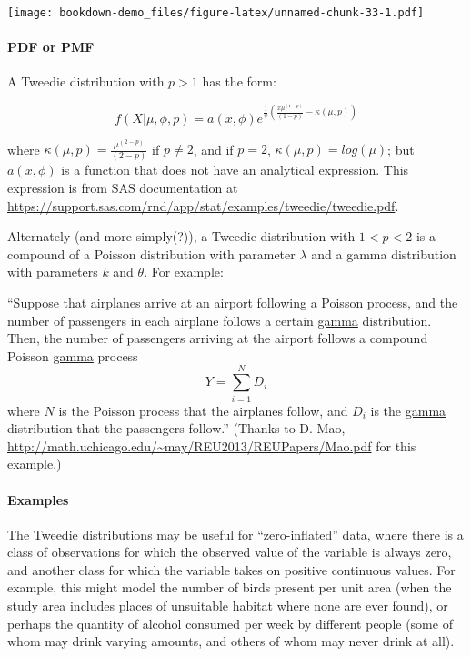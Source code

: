 \documentclass[]{book}
\let\oldparagraph\paragraph
\renewcommand{\paragraph}[1]{\oldparagraph{#1}\mbox{}}
\begin{document}
\texttt{[image: bookdown-demo\_files/figure-latex/unnamed-chunk-33-1.pdf]}

\hypertarget{pdf-or-pmf-6}{%
\paragraph{PDF or PMF}\label{pdf-or-pmf-6}}

A Tweedie distribution with \(p>1\) has the form:

\[ f(X \vert \mu, \phi, p) = a(x, \phi)e^{\frac{1}{\phi}(\frac{x\mu^{(1-p)}}{(1-p)} - \kappa(\mu,p))}\]

where \(\kappa(\mu,p) = \frac{\mu^{(2-p)}}{(2-p)}\) if \(p\neq2\), and if \(p=2\), \(\kappa(\mu,p) = log(\mu)\); but \(a(x,\phi)\) is a function that does not have an analytical expression. This expression is from SAS documentation at \url{https://support.sas.com/rnd/app/stat/examples/tweedie/tweedie.pdf}.

Alternately (and more simply(?)), a Tweedie distribution with \(1 < p < 2\) is a compound of a Poisson distribution with parameter \(\lambda\) and a gamma distribution with parameters \(k\) and \(\theta\). For example:

``Suppose that airplanes arrive at an airport following a Poisson process, and the number of passengers in each airplane follows a certain \protect\hyperlink{gamma}{gamma} distribution. Then, the number of passengers arriving at the airport follows a compound Poisson \protect\hyperlink{gamma}{gamma} process
\[ Y = \sum_{i=1}^{N} D_i\]
where \(N\) is the Poisson process that the airplanes follow, and \(D_i\) is the \protect\hyperlink{gamma}{gamma} distribution that the passengers follow.'' (Thanks to D. Mao, \url{http://math.uchicago.edu/~may/REU2013/REUPapers/Mao.pdf} for this example.)

\hypertarget{examples-6}{%
\paragraph{Examples}\label{examples-6}}

The Tweedie distributions may be useful for ``zero-inflated'' data, where there is a class of observations for which the observed value of the variable is always zero, and another class for which the variable takes on positive continuous values. For example, this might model the number of birds present per unit area (when the study area includes places of unsuitable habitat where none are ever found), or perhaps the quantity of alcohol consumed per week by different people (some of whom may drink varying amounts, and others of whom may never drink at all).


\end{document}
